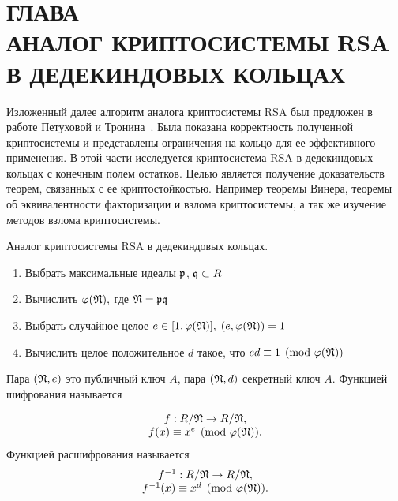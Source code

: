 \documentclass[_00_dissertation.tex]{subfiles}
\begin{document}
\onlyinsubfile{
    \renewcommand{\contentsname}{ОГЛАВЛЕНИЕ}
    \setcounter{tocdepth}{3}
    \tableofcontents
}

\chapter*{\MakeUppercase{Глава \\ Аналог криптосистемы RSA в дедекиндовых кольцах}}\label{chapter:RSA-cryptosystem}

Изложенный далее алгоритм аналога криптосистемы RSA был предложен в работе Петуховой и Тронина~\cite[с.~286]{source:Petukhova}.
Была показана корректность полученной криптосистемы и представлены ограничения  на кольцо для ее эффективного применения.
В этой части исследуется криптосистема RSA в дедекиндовых кольцах с конечным полем остатков.
Целью является получение доказательств теорем, связанных с ее криптостойкостью.
Например теоремы Винера, теоремы об эквивалентности факторизации и взлома криптосистемы, а так же изучение методов взлома криптосистемы.

\begin{algorithm}\label{algorithm:RSA_in_dedekind} \cite[с.~286]{source:Petukhova}
    Аналог криптосистемы RSA в дедекиндовых кольцах.

    \begin{enumerate}
        \item Выбрать максимальные идеалы $\mathfrak{p}$, $\mathfrak{q} \subset R$

        \item Вычислить $\varphi(\mathfrak{N}),$ где $\mathfrak{N} = \mathfrak{p} \mathfrak{q}$

        \item Выбрать случайное целое $e \in [1, \varphi(\mathfrak{N})],$ $(e, \varphi(\mathfrak{N}))=1$

        \item Вычислить целое положительное $d$ такое, что $ed \equiv 1 \pmod{\varphi(\mathfrak{N})}$
    \end{enumerate}

    Пара $(\mathfrak{N}, e)$ это публичный ключ $A$, пара $(\mathfrak{N}, d)$ секретный ключ $A$.
    Функцией шифрования называется

    \begin{equation*}
        \begin{array}{c}
            f: R/\mathfrak{N} \to R/\mathfrak{N},\\
            f(x) \equiv x^{e} \pmod{\varphi(\mathfrak{N})}.
        \end{array}
    \end{equation*}
    Функцией расшифрования называется
    \begin{equation*}
        \begin{array}{c}
            f^{-1}: R/\mathfrak{N} \to R/\mathfrak{N},\\
            f^{-1}(x) \equiv x^{d}\pmod{\varphi(\mathfrak{N})}.
        \end{array}
    \end{equation*}
\end{algorithm}
\end{document}
